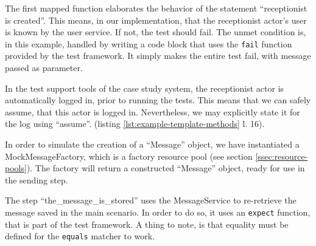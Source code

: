 \noindent The first mapped function elaborates the behavior of the statement ``receptionist is created''. This means, in our implementation, that the receptionist actor's user is known by the user service. If not, the test should fail. The unmet condition is, in this example, handled by writing a code block that uses the \texttt{fail} function provided by the test framework. It simply makes the entire test fail, with message passed as parameter.\medskip

\noindent In the test support tools of the case study system, the receptionist actor is automatically logged in, prior to running the tests. This means that we can safely assume, that this actor is logged in. Nevertheless, we may explicitly state it for the log using ``assume''. (listing \ref{lst:example-template-methods} l. 16).\medskip

\noindent In order to simulate the creation of a ``Message'' object, we have instantiated a MockMessageFactory, which is a factory resource pool (see section \ref{ssec:resource-pools}). The factory will return a constructed ``Message'' object, ready for use in the sending step.\medskip

\noindent The step ``the\_message\_is\_stored'' uses the MessageService to re-retrieve the message saved in the main scenario. In order to do so, it uses an \texttt{expect} function, that is part of the test framework. A thing to note, is that equality must be defined for the \texttt{equals} matcher to work.\medskip


